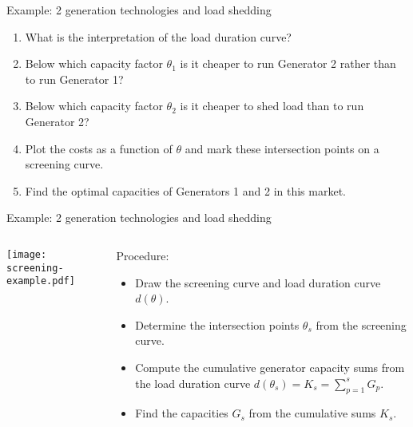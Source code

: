 \documentclass[10pt,aspectratio=169,dvipsnames]{beamer}
\let\olditem\item
\renewcommand{\item}{%
\olditem\vspace{5pt}}
\begin{document}
\begin{frame}{Example: 2 generation technologies and load shedding}
\begin{enumerate}
  \item What is the interpretation of the  load duration curve?
  \item Below which capacity factor $\theta_1$ is it cheaper to run Generator 2 rather than to run Generator 1?
  \item Below which capacity factor $\theta_2$ is it cheaper to shed load than to run Generator 2?
  \item Plot the costs as a function of
    $\theta$ and mark these intersection points on a screening curve.
  \item Find the optimal capacities of Generators 1 and 2 in this market.
\end{enumerate}
\end{frame}



\begin{frame}{Example: 2 generation technologies and load shedding}
  \begin{columns}[T]
  \begin{column}{6cm}

    \texttt{[image: screening-example.pdf]}

  \end{column}
  \begin{column}{7cm}
    Procedure:
    \begin{itemize}
    \item Draw the screening curve and load duration curve $d(\theta)$.
    \item Determine the intersection points $\theta_s$ from the screening curve.
    \item Compute the cumulative generator capacity sums from the load duration curve $d(\theta_s) = K_s = \sum_{p=1}^s G_p$.
      \item Find the capacities $G_s$ from the cumulative sums $K_s$.
    \end{itemize}
  \end{column}
  \end{columns}

\end{frame}
\end{document}
